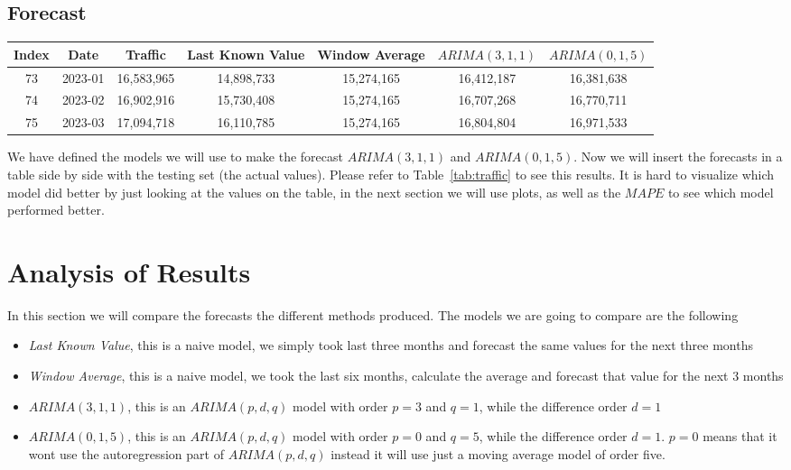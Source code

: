 \documentclass[journal]{IEEEtran}
\begin{document}
\subsection{Forecast}

\begin{table*}[htbp]
  \centering
  \caption{Traffic Data}
  \label{tab:traffic}
  \begin{tabular}{|c|c|c|c|c|c|c|}
    \hline
      Index & Date & Traffic & Last Known Value & Window Average & $ARIMA(3,1,1)
$ & $ARIMA(0,1,5)$ \\
    \hline
        73 & 2023-01 & 16,583,965 & 14,898,733 & 15,274,165 & 16,412,187 & 16,381,638 \\
        74 & 2023-02 & 16,902,916 & 15,730,408 & 15,274,165 & 16,707,268 & 16,770,711 \\
        75 & 2023-03 & 17,094,718 & 16,110,785 & 15,274,165 & 16,804,804 & 16,971,533 \\
    \hline
  \end{tabular}
\end{table*}

We have defined the models we will use to make the forecast $ARIMA(3,1,1)$
and $ARIMA(0,1,5)$. Now we will insert the forecasts in a table side by side
with the testing set (the actual values). Please refer to
Table~\ref{tab:traffic} to see this results. It is hard to visualize which
model did better by just looking at the values on the table, in the next
section we will use plots, as well as the $MAPE$ to see which model performed
better.


\section{Analysis of Results}\label{sec:analysis}

In this section we will compare the forecasts the different methods
produced. The models we are going to compare are the following

\begin{itemize}

    \item \emph{Last Known Value}, this is a naive model, we simply took last
        three months and forecast the same values for the next three months

    \item \emph{Window Average}, this is a naive model, we took the last six
        months, calculate the average and forecast that value for the next 3
        months

    \item \emph{$ARIMA(3,1,1)$}, this is an $ARIMA(p,d,q)$  model with order
        $p=3$ and $q=1$, while the difference order $d=1$

    \item \emph{$ARIMA(0,1,5)$}, this is an $ARIMA(p,d,q)$  model with order
        $p=0$ and $q=5$, while the difference order $d=1$. $p=0$ means that it
        wont use the autoregression part of $ARIMA(p,d,q)$ instead it will use
        just a moving average model of order five.

\end{itemize}
\end{document}
